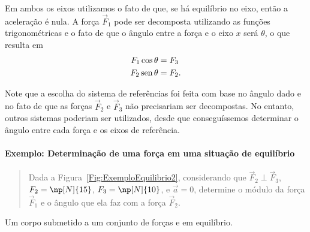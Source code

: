 \noindent{}Em ambos os eixos utilizamos o fato de que, se há equilíbrio no eixo, então a aceleração é nula. A força $\vec{F}_1$ pode ser decomposta utilizando as funções trigonométricas e o fato de que o ângulo entre a força e o eixo $x$ será $\theta$, o que resulta em
\begin{align}
    F_1 \cos\theta &= F_3 \\
    F_2 \operatorname{sen}\theta &= F_2.
\end{align}

Note que a escolha do sistema de referências foi feita com base no ângulo dado e no fato de que as forças $\vec{F}_2$ e $\vec{F}_3$ não precisariam ser decompostas. No entanto, outros sistemas poderiam ser utilizados, desde que conseguíssemos determinar o ângulo entre cada força e os eixos de referência.

\paragraph{Exemplo: Determinação de uma força em uma situação de equilíbrio}

\begin{quote}
    Dada a Figura~\ref{Fig:ExemploEquilibrio2}, considerando que $\vec{F}_2 \perp \vec{F}_3$, $F_2 = \np[N]{15}$, $F_3 = \np[N]{10}$, e $\vec{a} = 0$, determine o módulo da força $\vec{F}_1$ e o ângulo que ela faz com a força $\vec{F}_2$.
\end{quote}

\begin{marginfigure}
\centering
{}
\caption{Um corpo submetido a um conjunto de forças e em equilíbrio.\label{Fig:ExemploEquilibrio2}}
\end{marginfigure}

